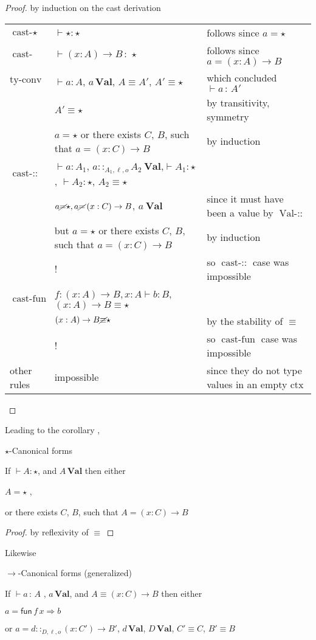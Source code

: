 \begin{proof}
by induction on the cast derivation

\begin{tabular}{lll}
$\operatorname{cast-\star}$ & $\vdash\star:\star$ & follows since $a=\star$\tabularnewline
$\operatorname{cast-fun-ty}$ & $\vdash\left(x:A\right)\rightarrow B\,:\,\star$ & follows since $a=\left(x:A\right)\rightarrow B$\tabularnewline
$\textrm{ty-conv}$ & $\vdash a:A$, $a\,\textbf{Val}$, $A\equiv A'$, $A'\equiv\star$ & which concluded $\vdash a\,:\,A'$\tabularnewline
 & $A'\equiv\star$ & by transitivity, symmetry\tabularnewline
 & $a=\star$ or there exists $C$, $B$, such that $a=\left(x:C\right)\rightarrow B$  & by induction\tabularnewline
$\operatorname{cast-::}$ & $\vdash a:A_{1}$, $a::_{A_{1},\ensuremath{\ell},o}A_{2}\:\textbf{Val}$,$\vdash A_{1}:\star$,
$\vdash A_{2}:\star$, $A_{2}\equiv\star$ & \tabularnewline
 & $a\cancel{=}\star,a\cancel{=}\left(x:C\right)\rightarrow B$, $a\:\textbf{Val}$ & since it must have been a value by $\operatorname{Val-::}$ \tabularnewline
 & but $a=\star$ or there exists $C$, $B$, such that $a=\left(x:C\right)\rightarrow B$  & by induction \tabularnewline
 & ! & so $\operatorname{cast-::}$ case was impossible\tabularnewline
$\operatorname{cast-fun}$ & $f:\left(x:A\right)\rightarrow B,x:A\vdash b:B$, $\left(x:A\right)\rightarrow B\equiv\star$ & \tabularnewline
 & $\left(x:A\right)\rightarrow B\cancel{\equiv}\star$ & by the stability of $\equiv$\tabularnewline
 & ! & so $\operatorname{cast-fun}$ case was impossible\tabularnewline
other rules & impossible & since they do not type values in an empty ctx\tabularnewline
\end{tabular}
\end{proof}
Leading to the corollary ,
\begin{cor}
$\star$-Canonical forms

If $\vdash A:\star$, and $A\,\textbf{Val}$ then either 

\textup{$A=\star$ , }

\textup{or there exists $C$, $B$, such that $A=\left(x:C\right)\rightarrow B$}
\end{cor}

\begin{proof}
by reflexivity of $\equiv$
\end{proof}
Likewise
\begin{lem}
$\rightarrow$-Canonical forms (generalized)

If $\vdash a\,:\,A$ , $a\,\textbf{Val}$, and $A\equiv\left(x:C\right)\rightarrow B$
then either

$a=\mathsf{fun}\,f\,x\Rightarrow b$ 

or $a=d::_{D,\ensuremath{\ell},o}\left(x:C'\right)\rightarrow B'$,
$d\,\textbf{Val}$, $D\,\textbf{Val}$, $C'\equiv C$, $B'\equiv B$ 
\end{lem}

